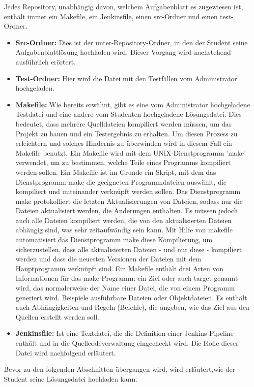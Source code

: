 \documentclass[apaper4,12p]{scrartcl}
\begin{document}
Jedes Repository, unabhängig davon, welchem Aufgabenblatt es zugewiesen ist, enthält immer ein Makefile, ein Jenkinsfile, einen src-Ordner und einen test-Ordner.
\begin{itemize}
    \item \textbf{Src-Ordner: } Dies ist der unter-Repository-Ordner, in den der Student seine Aufgabenblattlösung hochladen wird. Dieser Vorgang wird nachstehend ausführlich erörtert.
	\item \textbf{Test-Ordner: } Hier wird die Datei mit den Testfällen vom Administrator hochgeladen.
	\item \textbf{Makefile: }  Wie bereits erwähnt, gibt es eine vom Administrator hochgeladene Testdatei und eine andere vom Studenten hochgeladene Lösungsdatei. Dies bedeutet, dass mehrere Quelldateien kompiliert werden müssen, um das Projekt zu bauen und ein Testergebnis zu erhalten. Um diesen Prozess zu erleichtern und solches Hindernis zu überwinden wird in diesem Fall ein Makefile benutzt.
	\newline
	Ein Makefile wird mit dem UNIX-Dienstprogramm 'make' verwendet, um zu bestimmen, welche Teile eines Programms kompiliert werden sollen. Ein Makefile ist im Grunde ein Skript, mit dem das Dienstprogramm make die geeigneten Programmdateien auswählt, die kompiliert und miteinander verknüpft werden sollen. Das Dienstprogramm make protokolliert die letzten Aktualisierungen von Dateien, sodass nur die Dateien aktualisiert werden, die Änderungen enthalten. Es müssen jedoch auch alle Dateien kompiliert werden, die von den aktualisierten Dateien abhängig sind, was sehr zeitaufwändig sein kann. Mit Hilfe von makefile automatisiert das Dienstprogramm make diese Kompilierung, um sicherzustellen, dass alle aktualisierten Dateien - und nur diese - kompiliert werden und dass die neuesten Versionen der Dateien mit dem Hauptprogramm verknüpft sind.
	\newline
	Ein Makefile enthält drei Arten von Informationen für das make-Programm: ein Ziel oder auch target genannt wird, das normalerweise der Name einer Datei, die von einem Programm generiert wird. Beispiele ausführbare Dateien oder Objektdateien. Es enthält auch Abhängigkeiten und Regeln (Befehle), die angeben, wie das Ziel aus den Quellen erstellt werden soll. 
	 
	\item \textbf{Jenkinsfile: } Ist eine Textdatei, die die Definition einer Jenkins-Pipeline enthält und in die Quellcodeverwaltung eingecheckt wird. Die Rolle dieser Datei wird nachfolgend erläutert.
	\end{itemize}
Bevor zu den folgenden Abschnitten übergangen wird, wird erläutert,wie der Student seine Lösungsdatei hochladen kann.
\end{document}
